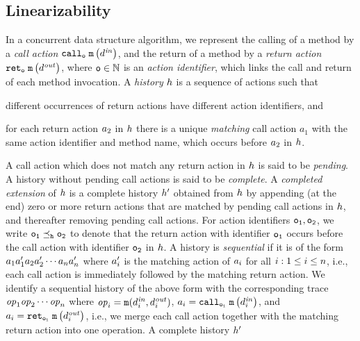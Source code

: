 \subsection{Linearizability}
In a concurrent
data structure algorithm, we represent the calling of a method by
a {\it call action} $\mathtt{call}_{\tt o}\; {\tt m}\left(d^{\it in}\right)$, and the return of a method by
a {\it return action} $\mathtt{ret}_{\tt o}\; {\tt m}\left(d^{\it out}\right)$, where $\tt o\in\mathbb{N}$ is an
{\it action identifier}, which links the call and return of each method invocation.
%
A {\it history} $h$ is a sequence of actions such that
\begin{inparaenum}[(i)]
\item
  different occurrences of return actions have different action identifiers, and
\item
  for each return action $a_2$ in $h$ there is a unique
{\it matching}  call action $a_1$ with the same action identifier and method name, which occurs before $a_2$ in $h$.
\end{inparaenum}
%
A call action which does not match any return action in $h$ is said
to be {\em pending}.
A history without pending call actions is said to be {\em complete}.
A {\em completed extension} of $h$ is a complete history
$h'$ obtained from $h$ by
  appending (at the end) zero or more return actions that are matched by
  pending call actions in $h$, and
  thereafter removing pending call actions.
%
For action identifiers $\tt o_1,\tt o_2$, we write
$\tt o_1\preceq_{h}\tt o_2$ to denote that
the return action with identifier $\tt o_1$ occurs before
the call action with identifier $\tt o_2$ in $h$.
A history is {\it sequential} if it is of the form
$a_1a'_1a_2a'_2\cdots a_na'_n$
where $a'_i$ is the matching action of $a_i$ 
for all $i:1\leq i\leq n$, i.e., each call action 
is immediately followed by the matching return action. 
%
We identify a sequential history of the above form with
the corresponding trace 
${\it op}_1{\it op}_2\cdots{\it op}_n$ where
${\it op}_i={\tt m}(d^{\it in}_i,d^{\it out}_i)$,
$a_i=\mathtt{call}_{\tt o_i}\; {\tt m}\left(d^{\it in}_{i}\right)$, and
$a_i=\mathtt{ret}_{\tt o_i}\; {\tt m}\left(d^{\it out}_{i}\right)$,
i.e., we merge each call action together with the matching return action
into one operation.
%
A complete history $h'$ 
